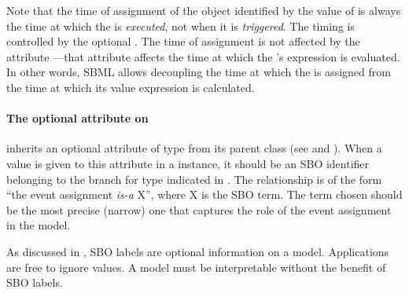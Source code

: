 
Note that the time of assignment of the object identified by the
value of  is always the time at which the \Event
is \emph{executed}, not when it is \emph{triggered}.  The timing
is controlled by the optional \Delay.  The time of assignment is
not affected by the \Event attribute
---that attribute affects the time
at which the \EventAssignment's  expression is
evaluated.  In other words, SBML allows decoupling the time at
which the  is assigned from the time at which its
value expression is calculated.


\paragraph{The optional  attribute on }
\label{sec:eventassignment-sboterm}

\EventAssignment inherits an optional 
attribute of type  from its parent
class \SBase (see 
and ).  When a value is given to this
attribute in a  \EventAssignment  instance, it should be an
SBO identifier belonging to the branch for type  \EventAssignment 
indicated in .  The relationship is
of the form ``the event assignment \emph{is-a} X'', where X is
the SBO term.  The term chosen should be the most precise (narrow)
one that captures the role of the event assignment  in the model.

As discussed in , SBO labels are optional
information on a model.  Applications are free to ignore
 values.  A model must be interpretable without the
benefit of SBO labels.


